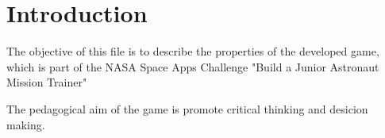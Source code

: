 \section{Introduction}
\renewcommand{\baselinestretch}{1}
\indent

The objective of this file is to describe the properties of the developed game, which is part of the NASA Space Apps Challenge "Build a Junior Astronaut Mission Trainer"

The pedagogical aim of the game is promote critical thinking and desicion making.


